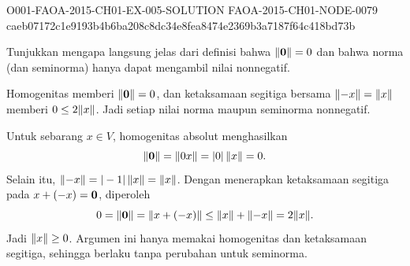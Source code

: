 \begin{o001solution}
  {O001-FAOA-2015-CH01-EX-005-SOLUTION}
  {FAOA-2015-CH01-NODE-0079}
  {caeb07172c1e9193b4b6ba208c8dc34e8fea8474e2369b3a7187f64c418bd73b}
\begin{o001statement}
Tunjukkan mengapa langsung jelas dari definisi bahwa $\lVert\mathbf{0}\rVert = 0$ dan bahwa norma
(dan seminorma) hanya dapat mengambil nilai nonnegatif.
\end{o001statement}
\begin{o001answer}
Homogenitas memberi $\lVert\mathbf{0}\rVert=0$, dan ketaksamaan segitiga bersama
$\lVert-x\rVert=\lVert x\rVert$ memberi $0\le2\lVert x\rVert$. Jadi setiap nilai norma maupun
seminorma nonnegatif.
\end{o001answer}
\begin{o001proof}
Untuk sebarang $x\in V$, homogenitas absolut menghasilkan
\[
\lVert\mathbf{0}\rVert=\lVert0x\rVert=|0|\,\lVert x\rVert=0.
\]
Selain itu, $\lVert-x\rVert=|-1|\,\lVert x\rVert=\lVert x\rVert$. Dengan menerapkan ketaksamaan
segitiga pada $x+(-x)=\mathbf{0}$, diperoleh
\[
0=\lVert\mathbf{0}\rVert=\lVert x+(-x)\rVert
\le\lVert x\rVert+\lVert-x\rVert=2\lVert x\rVert.
\]
Jadi $\lVert x\rVert\ge0$. Argumen ini hanya memakai homogenitas dan ketaksamaan
segitiga, sehingga berlaku tanpa perubahan untuk seminorma.
\end{o001proof}
\end{o001solution}

